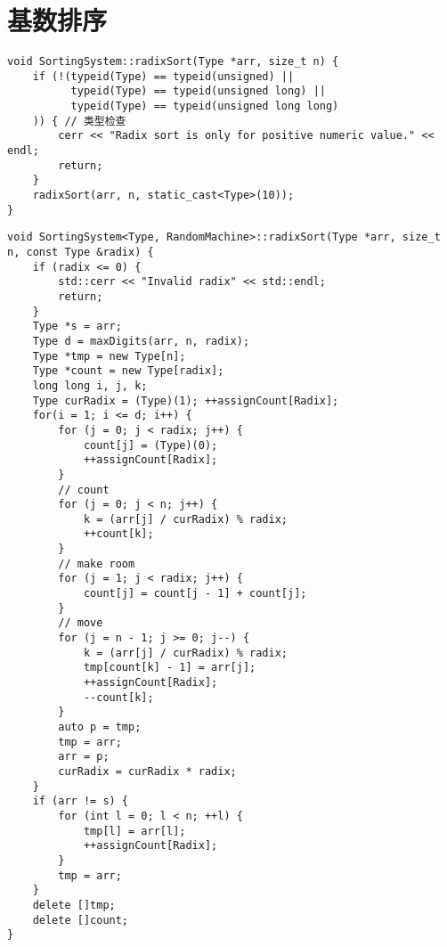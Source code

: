 \section{基数排序}
\begin{lstlisting}[firstnumber= 261, caption=radixSort]
void SortingSystem::radixSort(Type *arr, size_t n) {
    if (!(typeid(Type) == typeid(unsigned) ||
          typeid(Type) == typeid(unsigned long) ||
          typeid(Type) == typeid(unsigned long long)
    )) { // 类型检查
        cerr << "Radix sort is only for positive numeric value." << endl;
        return;
    }
    radixSort(arr, n, static_cast<Type>(10));
}
\end{lstlisting}

\begin{lstlisting}[firstnumber= 291]
void SortingSystem<Type, RandomMachine>::radixSort(Type *arr, size_t n, const Type &radix) {
    if (radix <= 0) {
        std::cerr << "Invalid radix" << std::endl;
        return;
    }
    Type *s = arr;
    Type d = maxDigits(arr, n, radix);
    Type *tmp = new Type[n];
    Type *count = new Type[radix];
    long long i, j, k;
    Type curRadix = (Type)(1); ++assignCount[Radix];
    for(i = 1; i <= d; i++) {
        for (j = 0; j < radix; j++) {
            count[j] = (Type)(0);
            ++assignCount[Radix];
        }
        // count
        for (j = 0; j < n; j++) {
            k = (arr[j] / curRadix) % radix;
            ++count[k];
        }
        // make room
        for (j = 1; j < radix; j++) {
            count[j] = count[j - 1] + count[j];
        }
        // move
        for (j = n - 1; j >= 0; j--) {
            k = (arr[j] / curRadix) % radix;
            tmp[count[k] - 1] = arr[j];
            ++assignCount[Radix];
            --count[k];
        }
        auto p = tmp;
        tmp = arr;
        arr = p;
        curRadix = curRadix * radix;
    }
    if (arr != s) {
        for (int l = 0; l < n; ++l) {
            tmp[l] = arr[l];
            ++assignCount[Radix];
        }
        tmp = arr;
    }
    delete []tmp;
    delete []count;
}
\end{lstlisting}

